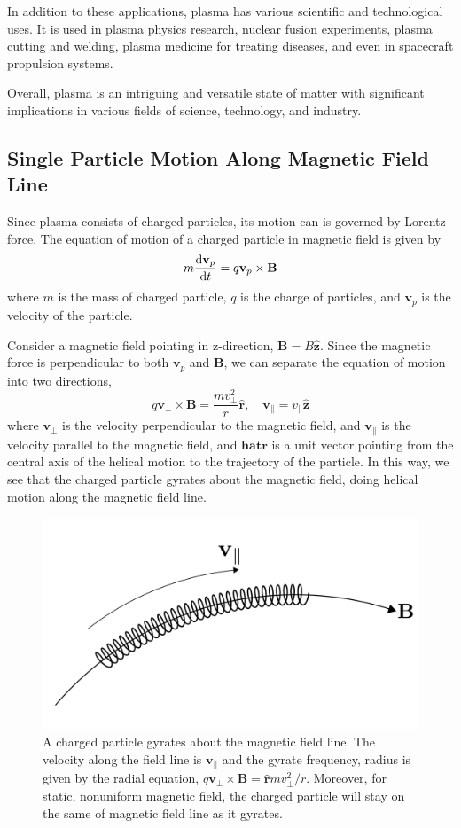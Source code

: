 In addition to these applications, plasma has various scientific and technological uses.
It is used in plasma physics research, nuclear fusion experiments, plasma cutting and welding, plasma medicine for treating diseases, and even in spacecraft propulsion systems.

Overall, plasma is an intriguing and versatile state of matter with significant implications in various fields of science, technology, and industry.

\subsection{Single Particle Motion Along Magnetic Field Line}
Since plasma consists of charged particles, its motion can is governed by Lorentz force. The equation of motion of a charged particle in magnetic field is given by
\[ m\dv{\mathbf{v}_p}{t} = q\mathbf{v}_p\times \mathbf{B} \]
where $m$ is the mass of charged particle, $q$ is the charge of particles, and $\mathbf{v}_p$ is the velocity of the particle.

Consider a magnetic field pointing in z-direction, $\mathbf{B}=B\mathbf{\hat{z}}$. Since the magnetic force is perpendicular to both $\mathbf{v}_p$ and $\mathbf{B}$, we can separate the equation of motion into two directions,
\[
	q\mathbf{v_{\perp}\times B} = \frac{mv_{\perp}^2}{r}\mathbf{\hat{r}},
	\quad
	\mathbf{v}_{\parallel} = v_{\parallel} \mathbf{\hat{z}} \]
where $\mathbf{v}_{\perp}$ is the velocity perpendicular to the magnetic field, and $\mathbf{v}_{\parallel}$ is the velocity parallel to the magnetic field, and $\mathbf{hat{r}}$ is a unit vector pointing from the central axis of the helical motion to the trajectory of the particle. In this way, we see that the charged particle gyrates about the magnetic field, doing helical motion along the magnetic field line.

\begin{figure}[htbp]
	\centering
	\includegraphics[width=0.7\linewidth]{img/gyrate-along-b-field}
	\caption{A charged particle gyrates about the magnetic field line. The velocity along the field line is $\mathbf{v}_{\parallel}$ and the gyrate frequency, radius is given by the radial equation, $q\mathbf{v_{\perp}\times B} = \mathbf{\hat{r}} mv_\perp^2/r$. Moreover, for static, nonuniform magnetic field, the charged particle will stay on the same of magnetic field line as it gyrates.}
	\label{fig:gyrate-along-b-field}
\end{figure}

